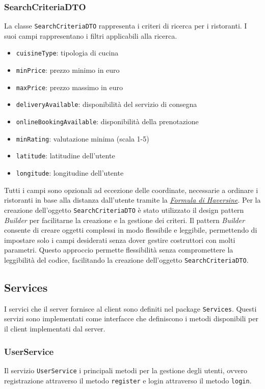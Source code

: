 \subsubsection{SearchCriteriaDTO}
\label{sec:searchcriteriadto}
La classe \texttt{SearchCriteriaDTO} rappresenta i criteri di 
ricerca per i ristoranti.
I suoi campi rappresentano i filtri applicabili alla ricerca.
\begin{itemize}
    \item \texttt{cuisineType}: tipologia di cucina
    \item \texttt{minPrice}: prezzo minimo in euro
    \item \texttt{maxPrice}: prezzo massimo in euro
    \item \texttt{deliveryAvailable}: disponibilità del servizio di consegna
    \item \texttt{onlineBookingAvailable}: disponibilità della prenotazione
    \item \texttt{minRating}: valutazione minima (scala 1-5)
    \item \texttt{latitude}: latitudine dell'utente
    \item \texttt{longitude}: longitudine dell'utente
\end{itemize}
Tutti i campi sono opzionali ad eccezione delle coordinate, 
necessarie a ordinare i ristoranti in base alla distanza
dall'utente tramite la 
\textit{\href{https://rosettacode.org/wiki/Haversine_formula}{Formula di Haversine}}.
Per la creazione dell'oggetto \texttt{SearchCriteriaDTO} è stato
utilizzato il design pattern \textit{Builder} per facilitarne la
creazione e la gestione dei criteri.
Il pattern \textit{Builder} consente di creare oggetti complessi
in modo flessibile e leggibile, permettendo di impostare solo i
campi desiderati senza dover gestire costruttori con molti 
parametri.
Questo approccio permette flessibilità senza compromettere la
leggibilità del codice, facilitando la creazione dell'oggetto
\texttt{SearchCriteriaDTO}.

\subsection{Services}
I servici che il server fornisce al client sono definiti nel 
package \texttt{Services}.
Questi servizi sono implementati come interfacce che definiscono
i metodi disponibili per il client implementati dal server.

\subsubsection{UserService}
\label{sec:userservice}
Il servizio \texttt{UserService} i principali metodi per la gestione
degli utenti, ovvero registrazione attraverso il metodo
\texttt{register} e login attraverso il metodo \texttt{login}.

